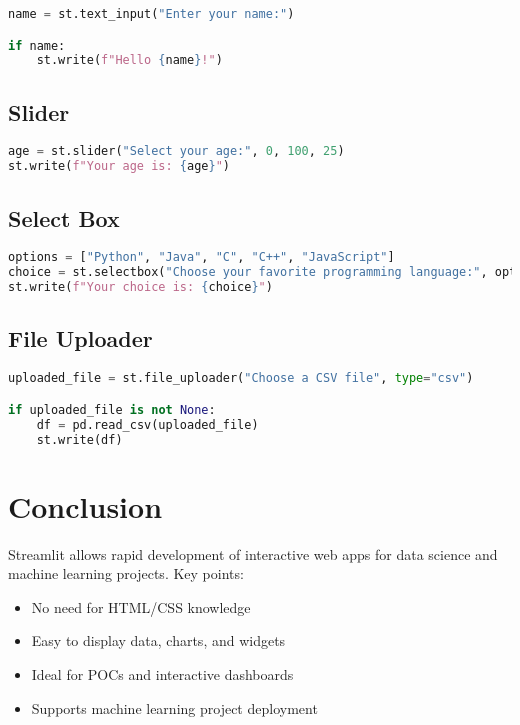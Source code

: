\begin{lstlisting}[language=Python]
name = st.text_input("Enter your name:")

if name:
    st.write(f"Hello {name}!")
\end{lstlisting}

\subsection{Slider}

\begin{lstlisting}[language=Python]
age = st.slider("Select your age:", 0, 100, 25)
st.write(f"Your age is: {age}")
\end{lstlisting}

\subsection{Select Box}

\begin{lstlisting}[language=Python]
options = ["Python", "Java", "C", "C++", "JavaScript"]
choice = st.selectbox("Choose your favorite programming language:", options)
st.write(f"Your choice is: {choice}")
\end{lstlisting}

\subsection{File Uploader}

\begin{lstlisting}[language=Python]
uploaded_file = st.file_uploader("Choose a CSV file", type="csv")

if uploaded_file is not None:
    df = pd.read_csv(uploaded_file)
    st.write(df)
\end{lstlisting}

\section{Conclusion}

Streamlit allows rapid development of interactive web apps for data science and machine learning projects. Key points:

\begin{itemize}
    \item No need for HTML/CSS knowledge
    \item Easy to display data, charts, and widgets
    \item Ideal for POCs and interactive dashboards
    \item Supports machine learning project deployment
\end{itemize}

